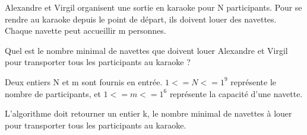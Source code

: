 \problemname{\problemyamlname}


Alexandre et Virgil organisent une sortie en karaoke pour N participants.
Pour se rendre au karaoke depuis le point de départ, ils doivent louer des navettes. Chaque navette peut accueillir m personnes.

Quel est le nombre minimal de navettes que doivent louer Alexandre et Virgil pour transporter tous les participants au karaoke ?

\begin{Input}
    Deux entiers N et m sont fournis en entrée. $1 <= N <= 1^9$ représente le nombre de participants, et $1 <= m <= 1^6$ représente la capacité d'une navette.
\end{Input}

\begin{Output}
    L'algorithme doit retourner un entier k, le nombre minimal de navettes à louer pour transporter tous les participants au karaoke.
\end{Output}
